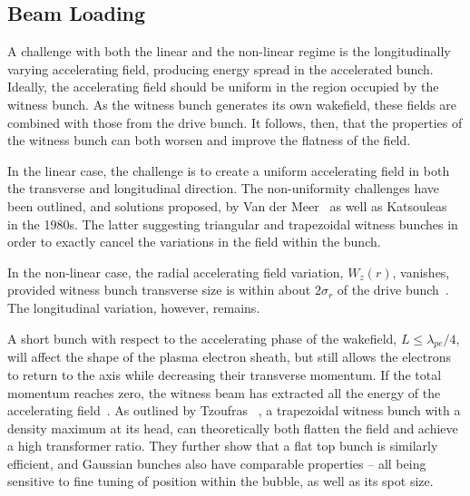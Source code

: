 \subsection{Beam Loading}
\label{Int:BPI:BLoad}

A challenge with both the linear and the non-linear regime is the longitudinally varying accelerating field, producing energy spread in the accelerated bunch.
Ideally, the accelerating field should be uniform in the region occupied by the witness bunch.
As the witness bunch generates its own wakefield, these fields are combined with those from the drive bunch.
It follows, then, that the properties of the witness bunch can both worsen and improve the flatness of the field.


In the linear case, the challenge is to create a uniform accelerating field in both the transverse and longitudinal direction.
The non-uniformity challenges have been outlined, and solutions proposed, by Van der Meer~\cite{van_der_meer:1985} as well as Katsouleas \etal~\cite{katsouleas:1987} in the 1980s.
The latter suggesting triangular and trapezoidal witness bunches in order to exactly cancel the variations in the field within the bunch.

In the non-linear case, the radial accelerating field variation, $W_{z}(r)$, vanishes, provided witness bunch transverse size is within about $2\sigma_{r}$ of the drive bunch~\cite{rosenzweig:1991}.
The longitudinal variation, however, remains.

A short bunch with respect to the accelerating phase of the wakefield, $L \leq \lambda_{pe}/4$, will affect the shape of the plasma electron sheath, but still allows the electrons to return to the axis while decreasing their transverse momentum.
If the total momentum reaches zero, the witness beam has extracted all the energy of the accelerating field~\cite{lu:2006a,lu:2006}.
As outlined by Tzoufras \etal~\cite{tzoufras:2009}, a trapezoidal witness bunch with a density maximum at its head, can theoretically both flatten the field and achieve a high transformer ratio.
They further show that a flat top bunch is similarly efficient, and Gaussian bunches also have comparable properties -- all being sensitive to fine tuning of position within the bubble, as well as its spot size.

